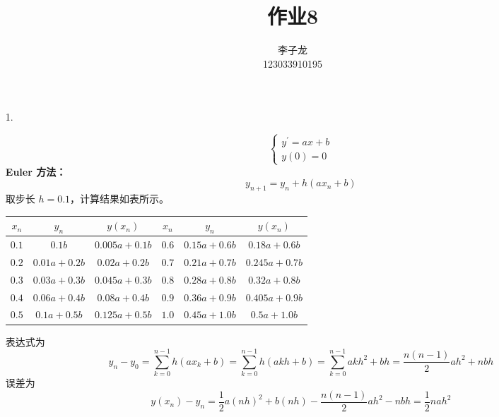 \documentclass{sjtuarticle}
\title{作业8}
\author{李子龙\\123033910195}
\begin{document}
\maketitle


\begin{itemize}
    \item[1.] \begin{solution}
       \begin{equation*}
            \begin{cases}
                y^\prime = ax+b \\
                y(0) = 0
            \end{cases}
        \end{equation*}
        \textbf{Euler 方法：}\begin{equation*}
            y_{n+1}=y_n+h(ax_n+b)
        \end{equation*}
        取步长 $h=0.1$，计算结果如表所示。
        \begin{table}[h]
            \centering
            \begin{tabular}{ccc|ccc}
                \toprule
                $x_n$ & $y_n$ & $y(x_n)$ & $x_n$ & $y_n$ & $y(x_n)$ \\
                \midrule
                $0.1$   & $0.1 b$       & $0.005 a + 0.1 b$ & $0.6$   & $0.15 a + 0.6 b$      & $0.18 a + 0.6 b$ \\
                $0.2$   & $0.01 a + 0.2 b$      & $0.02 a + 0.2 b$ &                 $0.7$   & $0.21 a + 0.7 b$      & $0.245 a + 0.7 b$ \\
                $0.3$   & $0.03 a + 0.3 b$      & $0.045 a + 0.3 b$ &                 $0.8$   & $0.28 a + 0.8 b$      & $0.32 a + 0.8 b$ \\
                $0.4$   & $0.06 a + 0.4 b$      & $0.08 a + 0.4 b$ &                 $0.9$   & $0.36 a + 0.9 b$      & $0.405 a + 0.9 b$ \\
                $0.5$   & $0.1 a + 0.5 b$       & $0.125 a + 0.5 b$ &                 $1.0$   & $0.45 a + 1.0 b$      & $0.5 a + 1.0 b$ \\
                \bottomrule
            \end{tabular}
        \end{table}

        表达式为
        \begin{equation*}
            y_{n} - y_0 = \sum_{k=0}^{n-1} h(ax_k+b) =\sum_{k=0}^{n-1} h(akh+b) = \sum_{k=0}^{n-1} akh^2+bh = \frac{n(n-1)}{2}ah^2 +nbh
        \end{equation*}
        误差为
        \begin{equation*}
            y(x_n) - y_n = \frac{1}{2}a(nh)^2+b(nh)-\frac{n(n-1)}{2}ah^2 -nbh=\frac{1}{2}nah^2
        \end{equation*}


\end{solution}
\end{itemize}
\end{document}
